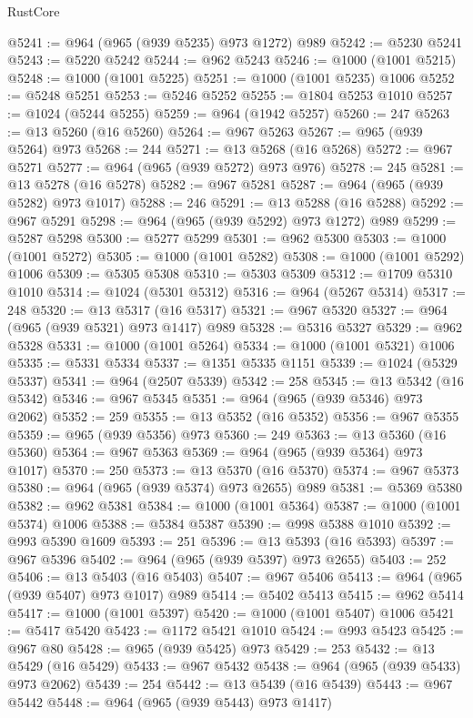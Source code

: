 \begin{lexlean}{RustCore}
\begin{coremodule}
@5241 := @964 (@965 (@939 @5235) @973 @1272) @989
@5242 := @5230 @5241
@5243 := @5220 @5242
@5244 := @962 @5243
@5246 := @1000 (@1001 @5215)
@5248 := @1000 (@1001 @5225)
@5251 := @1000 (@1001 @5235) @1006
@5252 := @5248 @5251
@5253 := @5246 @5252
@5255 := @1804 @5253 @1010
@5257 := @1024 (@5244 @5255)
@5259 := @964 (@1942 @5257)
@5260 := 247
@5263 := @13 @5260 (@16 @5260)
@5264 := @967 @5263
@5267 := @965 (@939 @5264) @973
@5268 := 244
@5271 := @13 @5268 (@16 @5268)
@5272 := @967 @5271
@5277 := @964 (@965 (@939 @5272) @973 @976)
@5278 := 245
@5281 := @13 @5278 (@16 @5278)
@5282 := @967 @5281
@5287 := @964 (@965 (@939 @5282) @973 @1017)
@5288 := 246
@5291 := @13 @5288 (@16 @5288)
@5292 := @967 @5291
@5298 := @964 (@965 (@939 @5292) @973 @1272) @989
@5299 := @5287 @5298
@5300 := @5277 @5299
@5301 := @962 @5300
@5303 := @1000 (@1001 @5272)
@5305 := @1000 (@1001 @5282)
@5308 := @1000 (@1001 @5292) @1006
@5309 := @5305 @5308
@5310 := @5303 @5309
@5312 := @1709 @5310 @1010
@5314 := @1024 (@5301 @5312)
@5316 := @964 (@5267 @5314)
@5317 := 248
@5320 := @13 @5317 (@16 @5317)
@5321 := @967 @5320
@5327 := @964 (@965 (@939 @5321) @973 @1417) @989
@5328 := @5316 @5327
@5329 := @962 @5328
@5331 := @1000 (@1001 @5264)
@5334 := @1000 (@1001 @5321) @1006
@5335 := @5331 @5334
@5337 := @1351 @5335 @1151
@5339 := @1024 (@5329 @5337)
@5341 := @964 (@2507 @5339)
@5342 := 258
@5345 := @13 @5342 (@16 @5342)
@5346 := @967 @5345
@5351 := @964 (@965 (@939 @5346) @973 @2062)
@5352 := 259
@5355 := @13 @5352 (@16 @5352)
@5356 := @967 @5355
@5359 := @965 (@939 @5356) @973
@5360 := 249
@5363 := @13 @5360 (@16 @5360)
@5364 := @967 @5363
@5369 := @964 (@965 (@939 @5364) @973 @1017)
@5370 := 250
@5373 := @13 @5370 (@16 @5370)
@5374 := @967 @5373
@5380 := @964 (@965 (@939 @5374) @973 @2655) @989
@5381 := @5369 @5380
@5382 := @962 @5381
@5384 := @1000 (@1001 @5364)
@5387 := @1000 (@1001 @5374) @1006
@5388 := @5384 @5387
@5390 := @998 @5388 @1010
@5392 := @993 @5390 @1609
@5393 := 251
@5396 := @13 @5393 (@16 @5393)
@5397 := @967 @5396
@5402 := @964 (@965 (@939 @5397) @973 @2655)
@5403 := 252
@5406 := @13 @5403 (@16 @5403)
@5407 := @967 @5406
@5413 := @964 (@965 (@939 @5407) @973 @1017) @989
@5414 := @5402 @5413
@5415 := @962 @5414
@5417 := @1000 (@1001 @5397)
@5420 := @1000 (@1001 @5407) @1006
@5421 := @5417 @5420
@5423 := @1172 @5421 @1010
@5424 := @993 @5423
@5425 := @967 @80
@5428 := @965 (@939 @5425) @973
@5429 := 253
@5432 := @13 @5429 (@16 @5429)
@5433 := @967 @5432
@5438 := @964 (@965 (@939 @5433) @973 @2062)
@5439 := 254
@5442 := @13 @5439 (@16 @5439)
@5443 := @967 @5442
@5448 := @964 (@965 (@939 @5443) @973 @1417)

\end{coremodule}
\end{lexlean}
